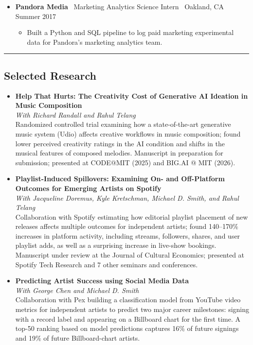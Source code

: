 \documentclass[10pt,letterpaper]{article}
\newcommand{\sep}{{\color{gray}\,\textbullet\,\,}}
\newcommand{\hsep}{\noindent\textcolor{gray}{\rule{\textwidth}{0.5pt}}}
\newcommand{\block}[1]{\begin{samepage}\hsep\subsection*{#1}\end{samepage}}
\begin{document}
\begin{itemize}[leftmargin=0pt, label={}, itemsep=4pt]
\begin{itemize}
  \item Delivered ad hoc analyses and reporting for senior and executive stakeholders to inform growth and retention decisions.
  \end{itemize}
\item \textbf{Pandora Media} \sep Marketing Analytics Science Intern \sep Oakland, CA \hfill Summer 2017
  \begin{itemize}
  \item Built a Python and SQL pipeline to log paid marketing experimental data for Pandora's marketing analytics team.
  \end{itemize}
\end{itemize}

\newpage

\block{Selected Research}

\begin{itemize}[leftmargin=0pt, label={}]
\item \textbf{Help That Hurts: The Creativity Cost of Generative AI Ideation in Music Composition}\\
\textit{With Richard Randall and Rahul Telang}\\
Randomized controlled trial examining how a state-of-the-art generative music system (Udio) affects creative workflows in music composition; found lower perceived creativity ratings in the AI condition and shifts in the musical features of composed melodies. Manuscript in preparation for submission; presented at CODE@MIT (2025) and BIG.AI @ MIT (2026).
\item \textbf{Playlist-Induced Spillovers: Examining On- and Off-Platform Outcomes for Emerging Artists on Spotify}\\
\textit{With Jacqueline Doremus, Kyle Kretschman, Michael D. Smith, and Rahul Telang}\\
Collaboration with Spotify estimating how editorial playlist placement of new releases affects multiple outcomes for independent artists; found 140--170\% increases in platform activity, including streams, followers, shares, and user playlist adds, as well as a surprising increase in live-show bookings. Manuscript under review at the Journal of Cultural Economics; presented at Spotify Tech Research and 7 other seminars and conferences.
\item \textbf{Predicting Artist Success using Social Media Data}\\
\textit{With George Chen and Michael D. Smith}\\
Collaboration with Pex building a classification model from YouTube video metrics for independent artists to predict two major career milestones: signing with a record label and appearing on a Billboard chart for the first time. A top-50 ranking based on model predictions captures 16\% of future signings and 19\% of future Billboard-chart artists.
\end{itemize}
\end{document}
